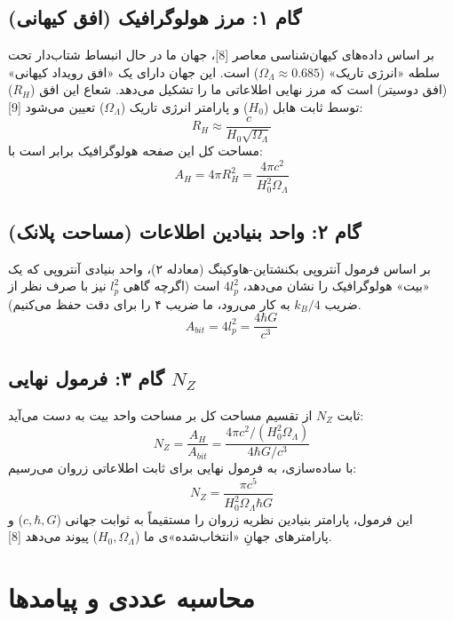 \documentclass[11pt, a4paper, twocolumn]{article} %
\begin{document}
\subsection{گام ۱: مرز هولوگرافیک (افق کیهانی)}
بر اساس داده‌های کیهان‌شناسی معاصر [8]، جهان ما در حال انبساط شتاب‌دار تحت سلطه «انرژی تاریک» ($\Omega_\Lambda \approx 0.685$) است. این جهان دارای یک «افق رویداد کیهانی» (افق دوسیتر) است که مرز نهایی اطلاعاتی ما را تشکیل می‌دهد. شعاع این افق ($R_H$) توسط ثابت هابل ($H_0$) و پارامتر انرژی تاریک ($\Omega_\Lambda$) تعیین می‌شود [9]:
\begin{equation}
R_H \approx \frac{c}{H_0 \sqrt{\Omega_\Lambda}}
\end{equation}
مساحت کل این صفحه هولوگرافیک برابر است با:
\begin{equation}
A_H = 4 \pi R_H^2 = \frac{4 \pi c^2}{H_0^2 \Omega_\Lambda}
\end{equation}

\subsection{گام ۲: واحد بنیادین اطلاعات (مساحت پلانک)}
بر اساس فرمول آنتروپی بکنشتاین-هاوکینگ (معادله ۲)، واحد بنیادی آنتروپی که یک «بیت» هولوگرافیک را نشان می‌دهد، $4 l_p^2$ است (اگرچه گاهی $l_p^2$ نیز با صرف نظر از ضریب $k_B/4$ به کار می‌رود، ما ضریب ۴ را برای دقت حفظ می‌کنیم).
\begin{equation}
A_{bit} = 4 l_p^2 = \frac{4 \hbar G}{c^3}
\end{equation}

\subsection{گام ۳: فرمول نهایی $N_Z$}
ثابت $N_Z$ از تقسیم مساحت کل بر مساحت واحد بیت به دست می‌آید:
\begin{equation}
N_Z = \frac{A_H}{A_{bit}} = \frac{ 4 \pi c^2 / (H_0^2 \Omega_\Lambda) }{ 4 \hbar G / c^3 }
\end{equation}
با ساده‌سازی، به فرمول نهایی برای ثابت اطلاعاتی زروان می‌رسیم:
\begin{equation}
\boxed{N_Z = \frac{\pi c^5}{H_0^2 \Omega_\Lambda \hbar G}}
\end{equation}
این فرمول، پارامتر بنیادین نظریه زروان را مستقیماً به ثوابت جهانی ($c, \hbar, G$) و پارامترهای جهانِ «انتخاب‌شده»‌ی ما ($H_0, \Omega_\Lambda$) پیوند می‌دهد [8].

\section{محاسبه عددی و پیامدها}
\end{document}

